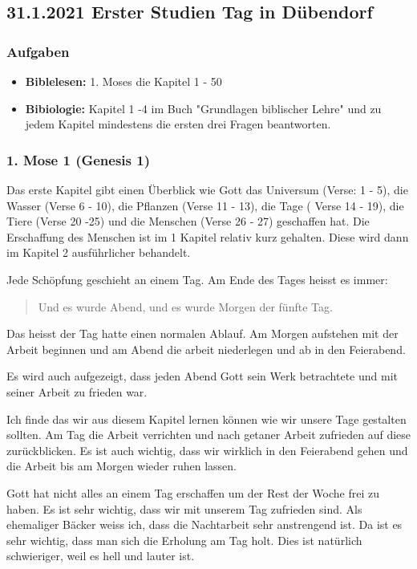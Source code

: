 \subsection{31.1.2021 Erster Studien Tag in Dübendorf}
\subsubsection{Aufgaben}
\begin{itemize}
    \item \textbf{Biblelesen:} 1. Moses die Kapitel 1 - 50
    \item \textbf{Bibiologie:} Kapitel 1 -4 im Buch "Grundlagen biblischer Lehre" 
    \cite{bibli:1} und zu jedem Kapitel mindestens die ersten drei Fragen beantworten. 
\end{itemize}

\subsubsection{1. Mose 1 (Genesis 1)}
Das erste Kapitel gibt einen Überblick wie Gott das Universum (Verse: 1 - 5), die Wasser (Verse 6 - 10), die Pflanzen (Verse 11 - 13), die Tage ( Verse 14 - 19), die Tiere (Verse 20 -25) und die Menschen (Verse 26 - 27) geschaffen hat. Die Erschaffung des Menschen ist im 1 Kapitel relativ kurz gehalten. Diese wird dann im Kapitel 2 ausführlicher behandelt.

Jede Schöpfung geschieht an einem Tag. Am Ende des Tages heisst es immer: \begin{quote}
    Und es wurde Abend, und es wurde Morgen der fünfte Tag.
\end{quote} Das heisst der Tag hatte einen normalen Ablauf. Am Morgen aufstehen mit der Arbeit beginnen und am Abend die arbeit niederlegen und ab in den Feierabend.

Es wird auch aufgezeigt, dass jeden Abend Gott sein Werk betrachtete und mit seiner Arbeit zu frieden war.

Ich finde das wir aus diesem Kapitel lernen können wie wir unsere Tage gestalten sollten. Am Tag die Arbeit verrichten und nach getaner Arbeit zufrieden auf diese zurückblicken. Es ist auch wichtig, dass wir wirklich in den Feierabend gehen und die Arbeit bis am Morgen wieder ruhen lassen.

Gott hat nicht alles an einem Tag erschaffen um der Rest der Woche frei zu haben. Es ist sehr wichtig, dass wir mit unserem Tag zufrieden sind. Als ehemaliger Bäcker weiss ich, dass die Nachtarbeit sehr anstrengend ist. Da ist es sehr wichtig, dass man sich die Erholung am Tag holt. Dies ist natürlich schwieriger, weil es hell und lauter ist.
